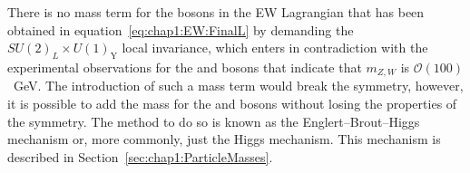 



There is no mass term for the bosons in the EW Lagrangian that has been obtained in 
equation~\ref{eq:chap1:EW:FinalL} by demanding the $SU(2)_{L} \times U(1)_\text{Y}$ local invariance, 
which enters in contradiction with the experimental observations for the \PW and \PZ 
bosons that indicate that $m_{Z,W}$ is $\mathcal{O}(100)$~GeV.  
The introduction of such a mass term would break the symmetry, however,  
it is possible to add the mass for the \PW and \PZ bosons without losing the properties of the symmetry. 
The method to do so is known as the Englert--Brout--Higgs mechanism
or, more commonly, just the Higgs mechanism. This mechanism is described in Section~\ref{sec:chap1:ParticleMasses}.


